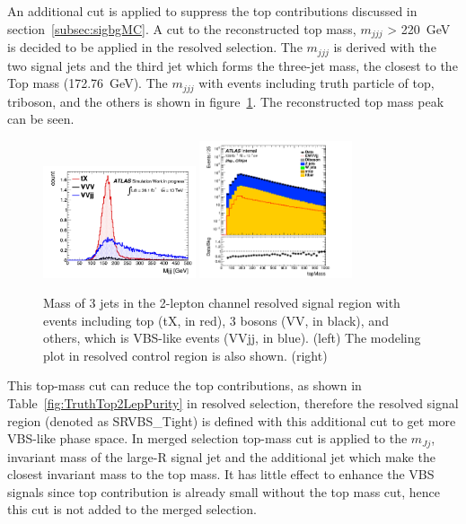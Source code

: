 An additional cut is applied to suppress the top contributions discussed in section~\ref{subsec:sigbgMC}. A cut to the reconstructed top mass, $m_{jjj}$ > 220~GeV is decided to be applied in the resolved selection. The $m_{jjj}$ is derived with the two signal jets and the third jet which forms the three-jet mass, the closest to the Top mass (172.76~GeV). The $m_{jjj}$ with events including truth particle of top, triboson, and the others is shown in figure~\ref{fig:2leptopMass}. The reconstructed top mass peak can be seen.
\begin{figure}[H]
    \begin{center}
      \includegraphics[width=0.4\textwidth]{figures/2lep/topMass/WZjjtopMasspeak}
      \includegraphics[width=0.4\textwidth]{figures/2lep/dataMC/C_0ptag2pjet_0ptv_CRVjet_topMass_Log}
        \caption{ Mass of 3 jets in the 2-lepton channel resolved signal region with events including top (tX, in red), 3 bosons (VV, in black), and others, which is VBS-like events (VVjj, in blue). (left) The modeling plot in resolved control region is also shown. (right)}
        \label{fig:2leptopMass}
    \end{center}
\end{figure}
This top-mass cut can reduce the top contributions, as shown in Table~\ref{fig:TruthTop2LepPurity} in resolved selection, therefore the resolved signal region (denoted as SRVBS\_Tight) is defined with this additional cut to get more VBS-like phase space. In merged selection top-mass cut is applied to the $m_{Jj}$, invariant mass of the large-R signal jet and the additional jet which make the closest invariant mass to the top mass. It has little effect to enhance the VBS signals since top contribution is already small without the top mass cut, hence this cut is not added to the merged selection.

